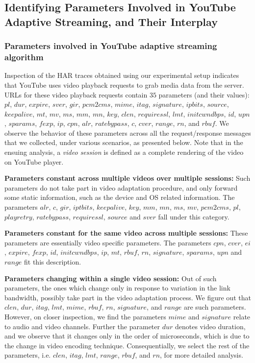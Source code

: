 \subsection{Identifying Parameters Involved in YouTube Adaptive Streaming, and Their Interplay}
\label{chap03s1:sec:parameters}

\subsubsection{Parameters involved in YouTube adaptive streaming algorithm}

Inspection of the HAR traces obtained using our experimental setup indicates that YouTube uses video playback requests to grab media data from the server.
%
URLs for these video playback requests contain $35$ parameters (and their values): $pl$, $dur$, $expire$, $sver$, $gir$, $pcm2cms$, $mime$, $itag$, $signature$, $ipbits$, $source$, $keepalive$, $mt$, $mv$, $ms$, $mm$, $mn$, $key$, $clen$, $requiressl$, $lmt$, $initcwndbps$, $id$, $upn$, $sparams$, $fexp$, $ip$, $cpn$, $alr$, $ratebypass$, $c$, $cver$, $range$, $rn$, and $rbuf$.
We observe the behavior of these parameters across all the request/response messages that we collected, under various scenarios, as presented below.
Note that in the ensuing analysis, a {\it video session} is defined as a complete rendering of the video on YouTube player.
 
\textbf{Parameters constant across multiple videos over multiple sessions:} Such parameters do not take part in video adaptation procedure, and only forward some static information, such as the device and OS related information.
The parameters $alr$, $c$, $gir$, $iptbits$, $keepalive$, $key$, $mm$, $mn$, $ms$, $mv$, $pcm2cms$, $pl$, $playretry$, $ratebypass$, $requiressl$, $source$ and $sver$ fall under this category.
 
\textbf{Parameters constant for the same video across multiple sessions:} These parameters are essentially video specific parameters.
The parameters $cpn$, $cver$, $ei$, $expire$, $fexp$, $id$, $initcwndbps$, $ip$, $mt$, $rbuf$, $rn$, $signature$, $sparams$, $upn$ and $range$ fit this description.
 
\textbf{Parameters changing within a single video session:} Out of such parameters, the ones which change only in response to variation in the link bandwidth, possibly take part in the video adaptation process.
We figure out that $clen$, $dur$, $itag$, $lmt$, $mime$, $rbuf$, $rn$, $signature$, and $range$ are such parameters.
However, on closer inspection, we find the parameters $mime$ and $signature$ relate to audio and video channels.
Further the parameter $dur$ denotes video duration, and we observe that it changes only in the order of microseconds, which is due to the change in video encoding technique.
Consequentially, we select the rest of the parameters, i.e. $clen$, $itag$, $lmt$, $range$, $rbuf$, and $rn$, for more detailed analysis.

